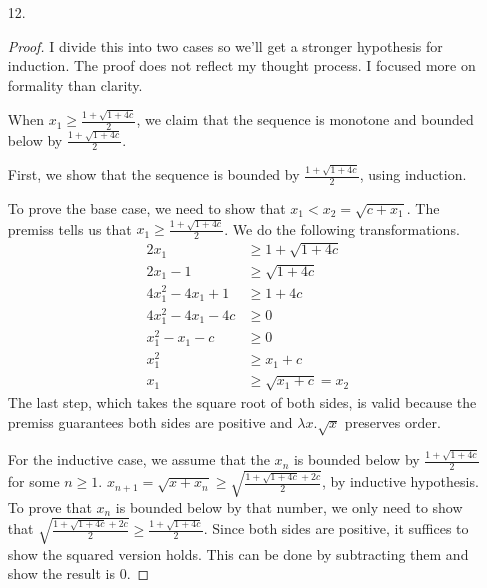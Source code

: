 \documentclass{article}
\begin{document}
\begin{enumerate}
  The theorem of mathematical induciton only applies for the set of
  natural numbers. The proof therefore glossed over some details
  regarding induction. To be more rigorous, one can either prove the
  generalized induction theorem for
  the set $[k,\infty) \cap \mathbb{N}$ or rewrite $k$ as $k=n+s$ where
  $s\geq 0$, and do induction on $s$. 

  
\item [12.]
  \begin{proof}
    I divide this into two cases so we'll get a stronger
    hypothesis for induction. The proof does not reflect my thought
    process. I focused more on formality than clarity.

    When $x_1 \geq  \frac{1+\sqrt{1+4c}}{2}$, we claim that the
    sequence is monotone and bounded below by
    $\frac{1+\sqrt{1+4c}}{2}$.

    First, we show that the sequence is bounded by
    $\frac{1+\sqrt{1+4c}}{2}$, using induction.

    To prove the base case, we need to show that $x_1 < x_2 = \sqrt{c
      + x_1}$. The premiss tells us that $x_1 \geq
    \frac{1+\sqrt{1+4c}}{2}$. We do the following transformations.
    \begin{equation*}
      \begin{split}
        2x_1 &\geq 1+ \sqrt{1+4c}\\
        2x_1 - 1 &\geq \sqrt{1+4c}\\
        4x_1^2 - 4x_1  + 1 &\geq 1+4c\\
        4x_1^2 - 4x_1 - 4c & \geq 0\\
        x_1^2 - x_1 -c &\geq 0\\
        x_1^2 &\geq x_1 + c\\
        x_1 &\geq \sqrt{x_1+c} = x_2
      \end{split}
    \end{equation*}
    The last step, which takes the square root of both sides, is valid
    because the premiss guarantees both sides are positive and
    $\lambda x. \sqrt{x}$ preserves order.

    For the inductive case, we assume that the $x_n$ is bounded below
    by $\frac{1+\sqrt{1+4c}}{2}$ for some $n \geq 1$. $x_{n+1} =
    \sqrt{x+x_n} \geq \sqrt{\frac{1+\sqrt{1+4c}+2c}{2}}$, by inductive
    hypothesis. To prove that $x_n$ is bounded below by that number,
    we only need to show that $\sqrt{\frac{1+\sqrt{1+4c}+2c}{2}} \geq
    \frac{1+\sqrt{1+4c}}{2}$. Since both sides are positive, it
    suffices to show the squared version holds. This can be done by
    subtracting them and show the result is $0$.


\end{proof}
\end{enumerate}
\end{document}
